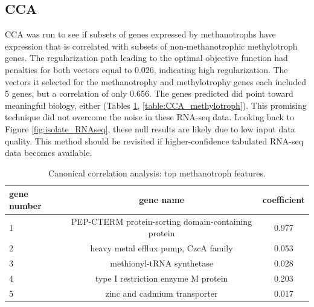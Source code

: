 

\subsection{CCA}

CCA was run to see if subsets of genes expressed by methanotrophs have expression that is correlated with subsets of non-methanotrophic methylotroph genes.  
The regularization path leading to the optimal objective function had penalties for both vectors equal to 0.026, indicating high regularization.
The vectors it selected for the methanotrophy and methylotrophy genes each included 5 genes, but a correlation of only 0.656.
The genes predicted did point toward meaningful biology, either (Tables \ref{table:CCA_methanotroph}, \ref{table:CCA_methylotroph}).
This promising technique did not overcome the noise in these RNA-seq data.
Looking back to Figure \ref{fig:isolate_RNAseq}, these null results are likely due to low input data quality.
This method should be revisited if higher-confidence tabulated RNA-seq data becomes available. 

\begin{table}[H]
\centering
\begin{singlespace}
\caption[Canonical correlation analysis: top features]{Canonical correlation analysis: top methanotroph features.}
\begin{tabular}{l | c | c}
          gene number & gene name & coefficient  \\
\midrule
	1 & PEP-CTERM protein-sorting domain-containing  protein & 0.977  \\ 
	2 & heavy metal efflux pump, CzcA family &  0.053  \\
	3 & methionyl-tRNA synthetase &  0.028 \\
	4 & type I restriction enzyme M protein &  0.203 \\
	5 & zinc and cadmium transporter &  0.017 \\
\end{tabular}
\label{table:CCA_methanotroph}
\end{singlespace}
\end{table}

